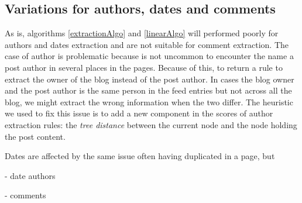 \subsection{Variations for authors, dates and comments}
As is, algorithms \ref{extractionAlgo} and \ref{linearAlgo} will performed poorly for authors and dates extraction and are not suitable for comment extraction. The case of author is problematic because is not uncommon to encounter the name a post author in several places in the pages. Because of this, to return a rule to extract the owner of the blog instead of the post author. In cases the blog owner and the post author is the same person in the feed entries but not across all the blog, we might extract the wrong information when the two differ. The heuristic we used to fix this issue is to add a new component in the scores of author extraction rules: the \emph{tree distance} between the current node and the node holding the post content.

Dates are affected by the same issue often having duplicated in a page, but



- date authors

- comments
